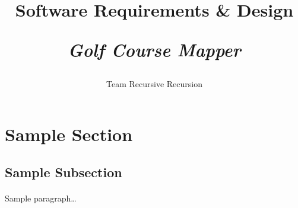 \documentclass{article}
\title{
    Software Requirements \& Design\\
    \begin{large}
        \textit{Golf Course Mapper}
    \end{large}
}
\date{
    \begin{small}
        \today
    \end{small}
}
\author{
    Team Recursive Recursion
}
\begin{document}
    \maketitle
    \newpage


    \section{Sample Section}

    \subsection{Sample Subsection}

    \paragraph{}
    Sample paragraph\ldots
\end{document}
